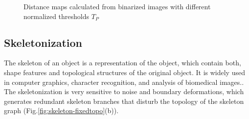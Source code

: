 \begin{figure}[h]
\begin{minipage}{0.5\textwidth}
\hspace{1pt}
\end{minipage}

\caption[Distance map - Actin]{ Distance maps calculated from binarized images
with different normalized thresholds $T_P$}
\label{fig:distancemap}
\end{figure}
 
\subsection{Skeletonization}
The skeleton of an object is a representation of the object, which contain both,
shape features and topological structures of the original object. It is widely
used in computer graphics, character recognition, and analysis of biomedical
images.\citep{bai_skeleton_2007,golland_fixed_2000,ge_generation_1996}. The
skeletonization is very sensitive to noise and boundary deformations, which generates redundant skeleton branches that disturb the
topology of the skeleton graph (Fig.\ref{fig:skeleton-fixedtopo}(b)).

